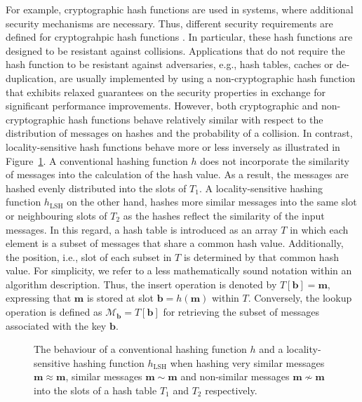 \documentclass[../../../main.tex]{subfiles}
\begin{document}
For example, cryptographic hash functions are used in systems, where additional security mechanisms are necessary. Thus, different security requirements are defined for cryptograhpic hash functions \cite[349]{williamcryptography}. In particular, these hash functions are designed to be resistant against collisions. Applications that do not require the hash function to be resistant against adversaries, e.g., hash tables, caches or de-duplication, are usually implemented by using a non-cryptographic hash function that exhibits relaxed guarantees on the security properties in exchange for significant performance improvements. However, both cryptographic and non-cryptographic hash functions behave relatively similar with respect to the distribution of messages on hashes and the probability of a collision. In contrast, locality-sensitive hash functions behave more or less inversely as illustrated in Figure~\ref{fig:hashing_differences}. A conventional hashing function $h$ does not incorporate the similarity of messages into the calculation of the hash value. As a result, the messages are hashed evenly distributed into the slots of $T_1$. A locality-sensitive hashing function $h_{\text{LSH}}$ on the other hand, hashes more similar messages into the same slot or neighbouring slots of $T_2$ as the hashes reflect the similarity of the input messages. In this regard, a hash table is introduced as an array $T$ in which each element is a subset of messages that share a common hash value. Additionally, the position, i.e., slot of each subset in $T$ is determined by that common hash value. For simplicity, we refer to a less mathematically sound notation within an algorithm description. Thus, the insert operation is denoted by $T[\bm{b}] = \bm{m}$, expressing that $\bm{m}$ is stored at slot $\bm{b} = h(\bm{m})$ within $T$. Conversely, the lookup operation is defined as $\mathcal{M}_{\bm{b}} = T[\bm{b}]$ for retrieving the subset of messages associated with the key $\bm{b}$.
\begin{figure}[t!]
    \centering
    
    \caption[Behaviour of hashing functions]{The behaviour of a conventional hashing function $h$ and a locality-sensitive hashing function $h_{\text{LSH}}$ when hashing very similar messages $\bm{m} \approx \bm{m}$, similar messages $\bm{m} \sim \bm{m}$ and non-similar messages $\bm{m} \not\sim \bm{m}$ into the slots of a hash table $T_1$ and $T_2$ respectively.}
    \label{fig:hashing_differences}
\end{figure}
\end{document}
